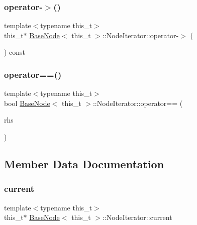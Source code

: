 \subsubsection{\texorpdfstring{operator-\/$>$()}{operator->()}}
{\footnotesize\ttfamily template$<$typename this\+\_\+t$>$ \\
this\+\_\+t$\ast$ \hyperlink{class_base_node}{Base\+Node}$<$ this\+\_\+t $>$\+::Node\+Iterator\+::operator-\/$>$ (\begin{DoxyParamCaption}{ }\end{DoxyParamCaption}) const\hspace{0.3cm}{\ttfamily [inline]}}

\mbox{\label{class_base_node_1_1_node_iterator_af3e1ab104af103b5536e4b9237fba588}} 
\subsubsection{\texorpdfstring{operator==()}{operator==()}}
{\footnotesize\ttfamily template$<$typename this\+\_\+t$>$ \\
bool \hyperlink{class_base_node}{Base\+Node}$<$ this\+\_\+t $>$\+::Node\+Iterator\+::operator== (\begin{DoxyParamCaption}\item[{const \hyperlink{class_base_node_1_1_node_iterator}{Node\+Iterator} \&}]{rhs }\end{DoxyParamCaption})\hspace{0.3cm}{\ttfamily [inline]}}



\subsection{Member Data Documentation}
\mbox{\label{class_base_node_1_1_node_iterator_a64b6d98532282b0d5c4b00454f2dd9cb}} 
\subsubsection{\texorpdfstring{current}{current}}
{\footnotesize\ttfamily template$<$typename this\+\_\+t$>$ \\
this\+\_\+t$\ast$ \hyperlink{class_base_node}{Base\+Node}$<$ this\+\_\+t $>$\+::Node\+Iterator\+::current\hspace{0.3cm}{\ttfamily [protected]}}

